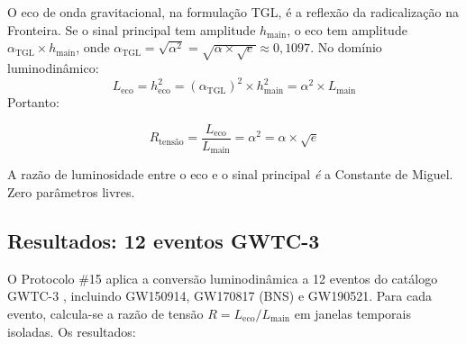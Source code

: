 \documentclass[12pt,a4paper,twoside]{article}
\newcommand{\alphaii}{\alpha^{2}}
\begin{document}
O eco de onda gravitacional, na formulação TGL, é a reflexão da radicalização na Fronteira. Se o sinal principal tem amplitude $h_{\text{main}}$, o eco tem amplitude $\alpha_{\text{TGL}} \times h_{\text{main}}$, onde $\alpha_{\text{TGL}} = \sqrt{\alphaii} = \sqrt{\alpha \times \sqrt{e}} \approx 0{,}1097$. No domínio luminodinâmico:
%
\begin{equation}
L_{\text{eco}} = h_{\text{eco}}^2 = (\alpha_{\text{TGL}})^2 \times h_{\text{main}}^2 = \alphaii \times L_{\text{main}}
\end{equation}
%
Portanto:
%
\begin{equationbox}[title={Razão de tensão}]
\begin{equation}
R_{\text{tensão}} = \frac{L_{\text{eco}}}{L_{\text{main}}} = \alphaii = \alpha \times \sqrt{e}
\label{eq:R_tensao}
\end{equation}
\end{equationbox}
%
A razão de luminosidade entre o eco e o sinal principal \textit{é} a Constante de Miguel. Zero parâmetros livres.


\subsection{Resultados: 12 eventos GWTC-3}

O Protocolo \#15 aplica a conversão luminodinâmica a 12 eventos do catálogo GWTC-3 \cite{GWTC3}, incluindo GW150914, GW170817 (BNS) e GW190521. Para cada evento, calcula-se a razão de tensão $R = L_{\text{eco}}/L_{\text{main}}$ em janelas temporais isoladas. Os resultados:
\end{document}
